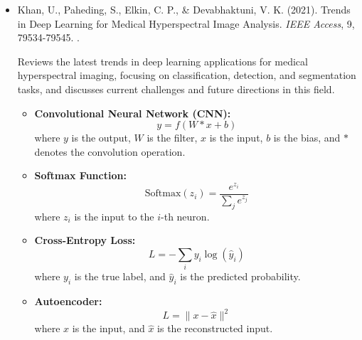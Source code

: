 \documentclass[10pt,svgnames,fragile]{beamer}
\begin{document}
\begin{frame}
\tiny
\begin{itemize}

    \item Khan, U., Paheding, S., Elkin, C. P., \& Devabhaktuni, V. K. (2021). Trends in Deep Learning for Medical Hyperspectral Image Analysis. \textit{IEEE Access}, 9, 79534-79545. \href{https://doi.org/10.1109/ACCESS.2021.3068392}{\color{blue}{DOI: 10.1109/ACCESS.2021.3068392}}. \cite{khanTrendsDeepLearning2021}

    {\color{gray}Reviews the latest trends in deep learning applications for medical hyperspectral imaging, focusing on classification, detection, and segmentation tasks, and discusses current challenges and future directions in this field.}
    \begin{itemize} \tiny
    \item \textbf{Convolutional Neural Network (CNN):}
    \[
    y = f(W * x + b)
    \]
    where \( y \) is the output, \( W \) is the filter, \( x \) is the input, \( b \) is the bias, and \( * \) denotes the convolution operation.
    \item \textbf{Softmax Function:}
    \[
    \text{Softmax}(z_i) = \frac{e^{z_i}}{\sum_{j} e^{z_j}}
    \]
    where \( z_i \) is the input to the \( i \)-th neuron.
    \item \textbf{Cross-Entropy Loss:}
    \[
    L = -\sum_{i} y_i \log(\hat{y}_i)
    \]
    where \( y_i \) is the true label, and \( \hat{y}_i \) is the predicted probability.
    \item \textbf{Autoencoder:}
    \[
    L = \| x - \hat{x} \|^2
    \]
    where \( x \) is the input, and \( \hat{x} \) is the reconstructed input.
    \end{itemize}

\end{itemize}
\end{frame}
\end{document}
